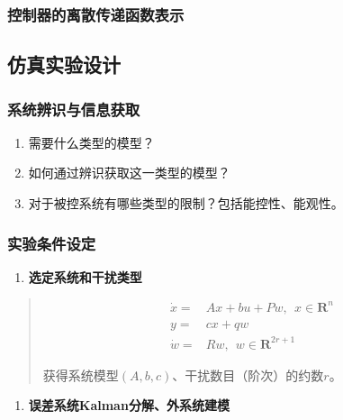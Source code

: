 \documentclass[
  12pt,
  a4paper
]{article}
\begin{document}
\subsubsection{控制器的离散传递函数表示}\label{ux63a7ux5236ux5668ux7684ux79bbux6563ux4f20ux9012ux51fdux6570ux8868ux793a}

\subsection{仿真实验设计}\label{ux4effux771fux5b9eux9a8cux8bbeux8ba1}

\subsubsection{系统辨识与信息获取}\label{ux7cfbux7edfux8fa8ux8bc6ux4e0eux4fe1ux606fux83b7ux53d6}

\begin{enumerate}
\def\labelenumi{\arabic{enumi}.}
\item
  需要什么类型的模型？
\item
  如何通过辨识获取这一类型的模型？
\item
  对于被控系统有哪些类型的限制？包括能控性、能观性。
\end{enumerate}

\subsubsection{实验条件设定}\label{ux5b9eux9a8cux6761ux4ef6ux8bbeux5b9a}

\begin{enumerate}
\def\labelenumi{\arabic{enumi}.}
\item
  \textbf{选定系统和干扰类型}
\end{enumerate}

\begin{quote}
\[\begin{aligned}
\dot{x} = & Ax + bu + Pw,\ \ x \in \mathbf{R}^{n} \\
y = & cx + qw \\
\dot{w} = & Rw,\ \ w \in \mathbf{R}^{2r + 1}
\end{aligned}\]

获得系统模型\((A,b,c)\)、干扰数目（阶次）的约数\(r\)。
\end{quote}

\begin{enumerate}
\def\labelenumi{\arabic{enumi}.}
\setcounter{enumi}{1}
\item
  \textbf{误差系统Kalman分解、外系统建模}
\end{enumerate}
\end{document}
